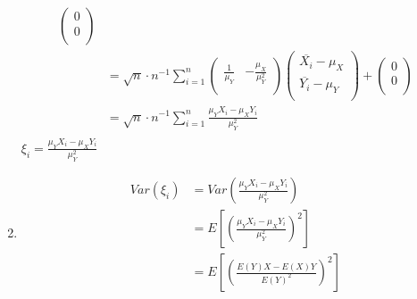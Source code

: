 \documentclass[12pt,letterpaper, onecolumn]{exam}
\begin{document}
\begin{questions}
\begin{solution}
\begin{enumerate}
\begin{align*}
\begin{pmatrix}
                0 \\
                0 \\
            \end{pmatrix} \\
            & = \sqrt{n} \cdot n^{-1} \sum_{i=1}^n \begin{pmatrix}
                \frac{1}{\mu_Y} &
            -\frac{\mu_X}{\mu_Y^2} \\
            \end{pmatrix}
            \begin{pmatrix}
                \overline{X_i} - \mu_X \\
                \overline{Y_i} - \mu_Y \\
            \end{pmatrix} + \begin{pmatrix}
                0 \\
                0 \\
                \end{pmatrix} \\
            &  = \sqrt{n} \cdot n^{-1} \sum_{i=1}^n \frac{\mu_Y X_i-\mu_X Y_i}{\mu_Y^2} \\
        \end{align*} 
        $\xi_i = \frac{\mu_Y X_i-\mu_X Y_i}{\mu_Y^2}$
        \item \begin{align*}
            Var(\xi_i)& = Var(\frac{\mu_Y X_i-\mu_X Y_i}{\mu_Y^2}) \\
            & = E[(\frac{\mu_Y X_i-\mu_X Y_i}{\mu_Y^2})^2] \\
            & = E[(\frac{E(Y)X-E(X) Y}{E(Y)^2})^2]
        \end{align*}
    \end{enumerate}
    
    \end{solution}


\end{questions}
\end{document}
